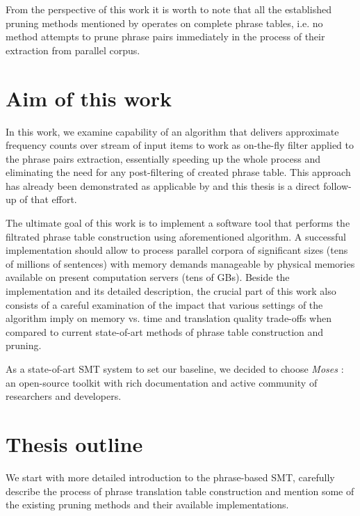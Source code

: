 From the perspective of this work it is worth to note that all the established pruning methods
mentioned by \citet{zens:systcomp} operates on complete phrase tables, i.e. no method attempts
to prune phrase pairs immediately in the process of their extraction from parallel corpus.


\section{Aim of this work}

In this work, we examine capability of an algorithm that delivers approximate
frequency counts over stream of input items \citep{manku:lossycounting} to
work as on-the-fly filter applied to the phrase pairs extraction,
essentially speeding up the whole process and eliminating the need for
any post-filtering of created phrase table.
This approach has already been demonstrated as applicable by \citet{przywara:eppex}
and this thesis is a direct follow-up of that effort.

The ultimate goal of this work is to implement a software tool that performs
the filtrated phrase table construction using aforementioned algorithm.
A successful implementation should allow to process parallel corpora of
significant sizes (tens of millions of sentences) with memory demands manageable
by physical memories available on present computation servers (tens of GBs).
Beside the implementation and its detailed description, the crucial part of
this work also consists of a careful examination of the impact that various
settings of the algorithm imply on memory vs. time and translation quality
trade-offs when compared to current state-of-art methods of phrase table
construction and pruning.

As a state-of-art SMT system to set our baseline, we decided to choose \emph{Moses}
\citep{koehn:moses}: an open-source toolkit with rich documentation and active
community of researchers and developers.

\section{Thesis outline}

We start with more detailed introduction to the phrase-based SMT,
carefully describe the process of phrase translation table construction
and mention some of the existing pruning methods and their available
implementations.

